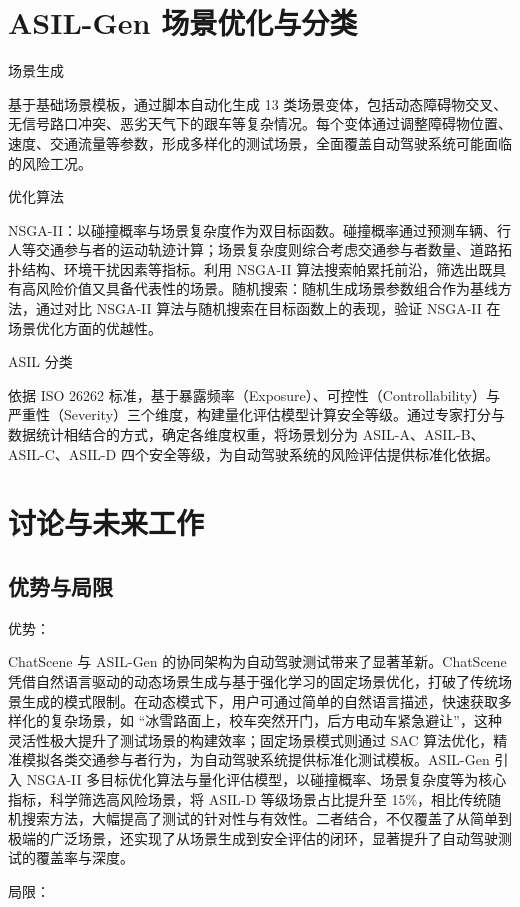 \section{ASIL-Gen 场景优化与分类}
场景生成

基于基础场景模板，通过脚本自动化生成 13 类场景变体，包括动态障碍物交叉、无信号路口冲突、恶劣天气下的跟车等复杂情况。每个变体通过调整障碍物位置、速度、交通流量等参数，形成多样化的测试场景，全面覆盖自动驾驶系统可能面临的风险工况。

优化算法

NSGA-II：以碰撞概率与场景复杂度作为双目标函数。碰撞概率通过预测车辆、行人等交通参与者的运动轨迹计算；场景复杂度则综合考虑交通参与者数量、道路拓扑结构、环境干扰因素等指标。利用 NSGA-II 算法搜索帕累托前沿，筛选出既具有高风险价值又具备代表性的场景。​
随机搜索：随机生成场景参数组合作为基线方法，通过对比 NSGA-II 算法与随机搜索在目标函数上的表现，验证 NSGA-II 在场景优化方面的优越性。

ASIL 分类

依据 ISO 26262 标准，基于暴露频率（Exposure）、可控性（Controllability）与严重性（Severity）三个维度，构建量化评估模型计算安全等级。通过专家打分与数据统计相结合的方式，确定各维度权重，将场景划分为 ASIL-A、ASIL-B、ASIL-C、ASIL-D 四个安全等级，为自动驾驶系统的风险评估提供标准化依据。


\section{讨论与未来工作}
\subsection{优势与局限}

优势：

ChatScene 与 ASIL-Gen 的协同架构为自动驾驶测试带来了显著革新。ChatScene 凭借自然语言驱动的动态场景生成与基于强化学习的固定场景优化，打破了传统场景生成的模式限制。在动态模式下，用户可通过简单的自然语言描述，快速获取多样化的复杂场景，如 “冰雪路面上，校车突然开门，后方电动车紧急避让”，这种灵活性极大提升了测试场景的构建效率；固定场景模式则通过 SAC 算法优化，精准模拟各类交通参与者行为，为自动驾驶系统提供标准化测试模板。ASIL-Gen 引入 NSGA-II 多目标优化算法与量化评估模型，以碰撞概率、场景复杂度等为核心指标，科学筛选高风险场景，将 ASIL-D 等级场景占比提升至 15\%，相比传统随机搜索方法，大幅提高了测试的针对性与有效性。二者结合，不仅覆盖了从简单到极端的广泛场景，还实现了从场景生成到安全评估的闭环，显著提升了自动驾驶测试的覆盖率与深度。


局限：

